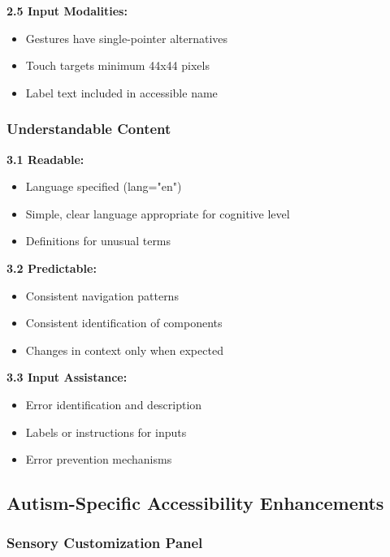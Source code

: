 \documentclass[12pt, a4paper]{article}
\begin{document}
\textbf{2.5 Input Modalities:}
\begin{itemize}[leftmargin=*]
    \item Gestures have single-pointer alternatives
    \item Touch targets minimum 44x44 pixels
    \item Label text included in accessible name
\end{itemize}

\subsubsection{Understandable Content}

\textbf{3.1 Readable:}
\begin{itemize}[leftmargin=*]
    \item Language specified (lang="en")
    \item Simple, clear language appropriate for cognitive level
    \item Definitions for unusual terms
\end{itemize}

\textbf{3.2 Predictable:}
\begin{itemize}[leftmargin=*]
    \item Consistent navigation patterns
    \item Consistent identification of components
    \item Changes in context only when expected
\end{itemize}

\textbf{3.3 Input Assistance:}
\begin{itemize}[leftmargin=*]
    \item Error identification and description
    \item Labels or instructions for inputs
    \item Error prevention mechanisms
\end{itemize}

\subsection{Autism-Specific Accessibility Enhancements}

\subsubsection{Sensory Customization Panel}
\end{document}
